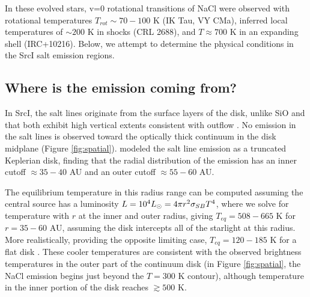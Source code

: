 \documentclass[twocolumn]{aastex62}
\newcommand{\sourcei}{SrcI\xspace}
\begin{document}
In these evolved stars, v=0 rotational transitions of NaCl were observed
with rotational temperatures ${T_{rot}\sim70-100}$ K (IK Tau, VY CMa), inferred
local temperatures of $\sim200$ K in shocks (CRL 2688), and $T\approx700$ K  in
an expanding shell (IRC+10216).  Below, we attempt to determine the physical
conditions in the \sourcei salt emission regions.

\subsection{Where is the emission coming from?}
In \sourcei, the salt lines originate from the surface layers of the disk,
unlike SiO and \water that both exhibit high vertical extents consistent with
outflow \citep{Ginsburg2018b}.  No emission in the salt lines is observed
toward the optically thick continuum in the disk midplane (Figure
\ref{fig:spatial}).  \citet{Ginsburg2018b} modeled the salt line emission as a
truncated Keplerian disk, finding that the radial distribution of the emission
has an inner cutoff $\approx35-40$ AU and an outer cutoff $\approx55-60$ AU.

The equilibrium temperature in this radius range can be computed assuming the central
source has a luminosity $L=10^4 L_{\odot} = 4 \pi r^2 \sigma_{SB} T^4 $, where we
solve for temperature with $r$ at the inner and outer radius, giving $T_{eq} =
508-665$ K for $r=35-60$ AU, assuming the disk intercepts all of the starlight 
at this radius.  More realistically, providing the opposite limiting case,
$T_{eq}=120-185$ K for a flat disk \citep{Chiang1997a}.  These cooler temperatures
are consistent with the observed brightness temperatures in the outer
part of the continuum disk (in Figure \ref{fig:spatial}, the NaCl emission
begins just beyond the $T=300$ K contour), although temperature in the inner
portion of the disk reaches $\gtrsim500$ K.
\end{document}
